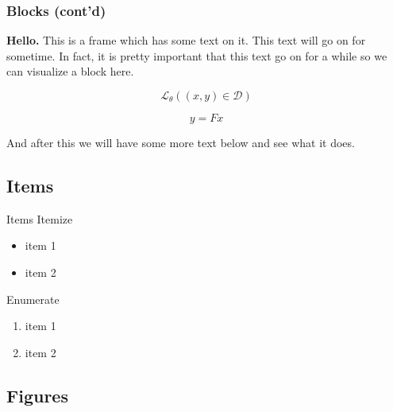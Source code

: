 \documentclass[compress, aspectratio=169]{beamer}
\begin{document}
\begin{frame}
    \frametitle{Blocks (cont'd)}
    \textbf{Hello.} This is a frame which has some text on it. This text will go on for sometime.
    In fact, it is pretty important that this text go on for a while so we can visualize a block here.

    \begin{center}
        \begin{minipage}{1.0\linewidth}
            \begin{block}{}
                \vspace{-1ex}
                \begin{equation*}
                    \mathcal{L}_{\theta}\left((x,y) \in \mathcal{D}\right)
                \end{equation*}
            \end{block}

            \begin{block}{}
                    \vspace{-1ex}
                    $$ y = Fx $$
            \end{block}
        \end{minipage}
    \end{center}

    And after this we will have some more text below and see what it does.
\end{frame}


\subsection{Items}

\begin{frame}{Items}
  Itemize
  \begin{itemize}
    \item item 1
    \item item 2
  \end{itemize}

  \bigskip

  Enumerate
  \begin{enumerate}
    \item item 1
    \item item 2
  \end{enumerate}
\end{frame}

\subsection{Figures}
\end{document}
